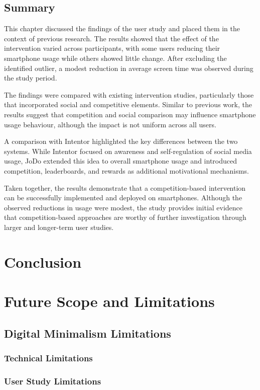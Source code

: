 \documentclass[11pt]{report}
\begin{document}
\section{Summary}

This chapter discussed the findings of the user study and placed them in the context of previous research. The results showed that the effect of the intervention varied across participants, with some users reducing their smartphone usage while others showed little change. After excluding the identified outlier, a modest reduction in average screen time was observed during the study period.

The findings were compared with existing intervention studies, particularly those that incorporated social and competitive elements. Similar to previous work, the results suggest that competition and social comparison may influence smartphone usage behaviour, although the impact is not uniform across all users.

A comparison with Intentor highlighted the key differences between the two systems. While Intentor focused on awareness and self-regulation of social media usage, JoDo extended this idea to overall smartphone usage and introduced competition, leaderboards, and rewards as additional motivational mechanisms.

Taken together, the results demonstrate that a competition-based intervention can be successfully implemented and deployed on smartphones. Although the observed reductions in usage were modest, the study provides initial evidence that competition-based approaches are worthy of further investigation through larger and longer-term user studies.


\newpage
\chapter{Conclusion}

\newpage
\chapter{Future Scope and Limitations}
\section{Digital Minimalism Limitations}
\subsection{Technical Limitations}
\subsection{User Study Limitations}
\end{document}
